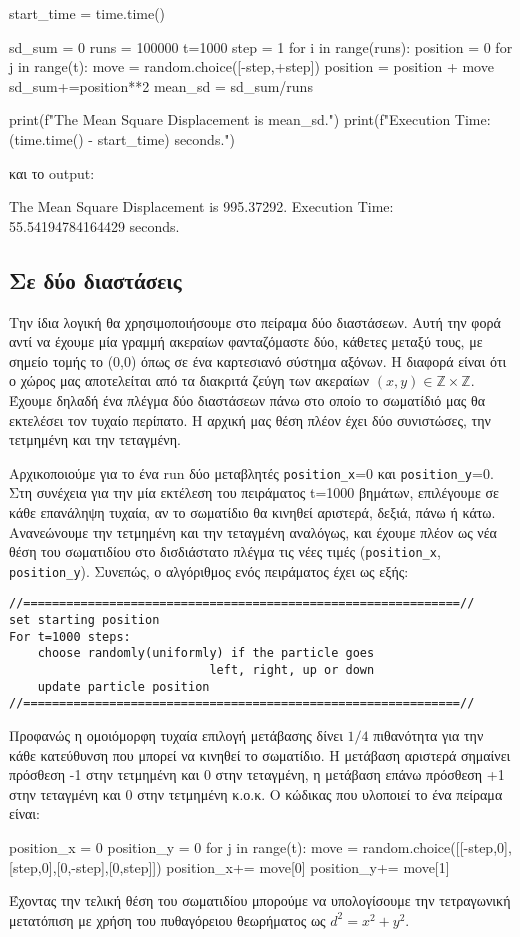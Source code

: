 \en
\begin{python}
start_time = time.time()

sd_sum = 0
runs = 100000
t=1000
step = 1
for i in range(runs):
    position = 0
    for j in range(t):
        move = random.choice([-step,+step])
        position = position + move
    sd_sum+=position**2
mean_sd = sd_sum/runs


print(f"The Mean Square Displacement is {mean_sd}.")
print(f"Execution Time: {(time.time() - start_time)} seconds.")
\end{python}
\gr 
και το {\en output}:
\en
\begin{python}
The Mean Square Displacement is 995.37292.
Execution Time: 55.54194784164429 seconds.
\end{python}
\gr
\subsection{Σε δύο διαστάσεις}
\label{Part1_b}
Την ίδια λογική θα χρησιμοποιήσουμε στο πείραμα δύο διαστάσεων. Αυτή την φορά αντί να έχουμε μία γραμμή ακεραίων φανταζόμαστε δύο, κάθετες μεταξύ τους, με σημείο τομής το (0,0) όπως σε ένα καρτεσιανό σύστημα αξόνων. Η διαφορά είναι ότι ο χώρος μας αποτελείται από τα διακριτά ζεύγη των ακεραίων $(x,y) \in \mathbb{Z} \times \mathbb{Z} $. Έχουμε δηλαδή ένα πλέγμα δύο διαστάσεων πάνω στο οποίο το σωματίδιό μας θα εκτελέσει τον τυχαίο περίπατο. Η αρχική μας θέση πλέον έχει δύο συνιστώσες, την τετμημένη και την τεταγμένη. 

Aρχικοποιούμε για το ένα {\en run} δύο μεταβλητές {\en \texttt{position\_x}}=0 και {\en \texttt{position\_y}}=0. Στη συνέχεια για την μία εκτέλεση του πειράματος {\en t}=1000 βημάτων, επιλέγουμε σε κάθε επανάληψη τυχαία, αν το σωματίδιο θα κινηθεί αριστερά, δεξιά, πάνω ή κάτω. Ανανεώνουμε την τετμημένη και την τεταγμένη αναλόγως, και έχουμε πλέον ως νέα θέση του σωματιδίου στο δισδιάστατο πλέγμα τις νέες τιμές
{\en (\texttt{position\_x}, \texttt{position\_y})}. Συνεπώς, ο αλγόριθμος ενός πειράματος έχει ως εξής:
\en
\begin{lstlisting}
//=============================================================//
set starting position 
For t=1000 steps:
    choose randomly(uniformly) if the particle goes 
                            left, right, up or down
    update particle position
//=============================================================//
\end{lstlisting}
\gr

Προφανώς η ομοιόμορφη τυχαία επιλογή μετάβασης δίνει $1/4$ πιθανότητα για την κάθε κατεύθυνση που μπορεί να κινηθεί το σωματίδιο. 
Η μετάβαση αριστερά σημαίνει πρόσθεση -1 στην τετμημένη και 0 στην τεταγμένη, η μετάβαση επάνω πρόσθεση +1 στην τεταγμένη και 0 στην τετμημένη κ.ο.κ.  Ο κώδικας που υλοποιεί το ένα πείραμα είναι:  
\newpage
\en
\begin{python}
position_x = 0
position_y = 0
for j in range(t):
    move = random.choice([[-step,0],[step,0],[0,-step],[0,step]])
    position_x+= move[0]
    position_y+= move[1]
\end{python}
\gr 
Έχοντας την τελική θέση του σωματιδίου μπορούμε να υπολογίσουμε την τετραγωνική μετατόπιση με χρήση του πυθαγόρειου θεωρήματος ως $d^2 = x^2+y^2$.

